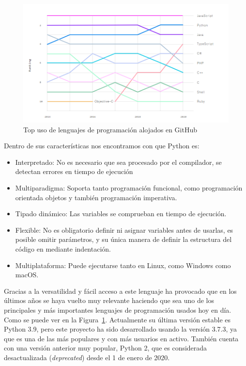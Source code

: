 \documentclass[a4paper, 12pt]{book}
\begin{document}
\begin{figure}
	\centering
	\includegraphics[width=18cm]{img/top_programing_languajes.png}
	\caption{Top uso de lenguajes de programación alojados en GitHub}
	\label{fig:Top_programming}
\end{figure}

Dentro de sus características nos encontramos con que Python es: 
\begin{itemize}
	\item Interpretado: No es necesario que sea procesado por el compilador, se detectan errores en tiempo de ejecución 
	\item Multiparadigma: Soporta tanto programación funcional, como programación orientada objetos y también programación imperativa.  
	\item Tipado dinámico: Las variables se comprueban en tiempo de ejecución. 
	\item Flexible: No es obligatorio definir ni asignar variables antes de usarlas, es posible omitir parámetros, y su única manera de definir la estructura del código en mediante indentación.
	\item Multiplataforma: Puede ejecutarse tanto en Linux, como Windows como macOS. 
\end{itemize}


Gracias a la versatilidad y fácil acceso a este lenguaje ha provocado que en los últimos años se haya vuelto muy relevante haciendo que sea uno de los principales y más importantes lenguajes de programación usados hoy en día. Como se puede ver en la Figura~\ref{fig:Top_programming}.
Actualmente su última versión estable es Python 3.9, pero este proyecto ha sido desarrollado usando la versión 3.7.3, ya que es una de las más populares y con más usuarios en activo. También cuenta con una versión anterior muy popular, Python 2, que es considerada desactualizada (\emph{deprecated}) desde el 1 de enero de 2020. 
\end{document}
